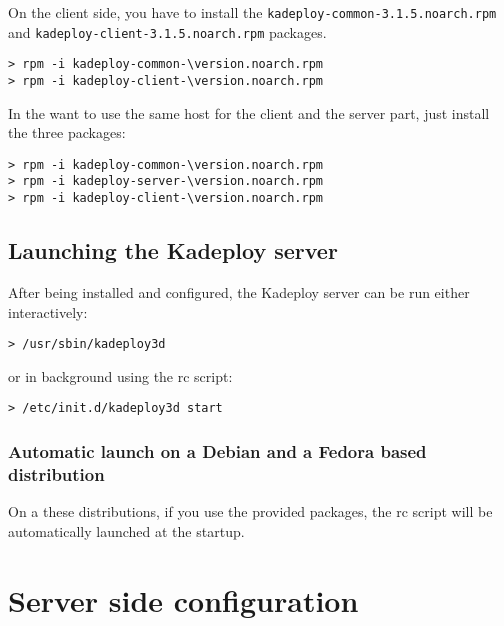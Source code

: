 \documentclass[a4wide,10pt,oneside]{book}
\newcommand{\version}{3.1.5}
\begin{document}
\noindent On the client side, you have to install the \texttt{kadeploy-common-\version.noarch.rpm} and \texttt{kadeploy-client-\version.noarch.rpm} packages.
\begin{small}
\begin{Verbatim}[commandchars=\\\{\}]
> rpm -i kadeploy-common-\version.noarch.rpm
> rpm -i kadeploy-client-\version.noarch.rpm
\end{Verbatim}
\end{small}

\noindent In the want to use the same host for the client and the server part, just install the three packages:
\begin{small}
\begin{Verbatim}[commandchars=\\\{\}]
> rpm -i kadeploy-common-\version.noarch.rpm
> rpm -i kadeploy-server-\version.noarch.rpm
> rpm -i kadeploy-client-\version.noarch.rpm
\end{Verbatim}
\end{small}


\section{Launching the Kadeploy server}
After being installed and configured, the Kadeploy server can be run either interactively:
\begin{small}
\begin{verbatim}
> /usr/sbin/kadeploy3d
\end{verbatim}
\end{small}
\noindent or in background using the rc script:
\begin{small}
\begin{verbatim}
> /etc/init.d/kadeploy3d start
\end{verbatim}
\end{small}

\subsection{Automatic launch on a Debian and a Fedora based distribution}
\noindent On a these distributions, if you use the provided packages, the rc script will be automatically launched at the startup.

\chapter{Server side configuration}
\end{document}
